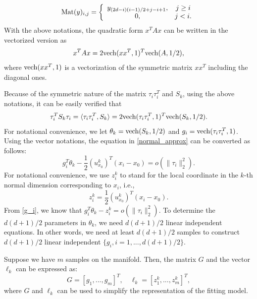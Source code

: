 \documentclass{article}
\theoremstyle{remark}
\begin{document}
\[
{\rm Mat} (y) _{i,j} =\left\{
\begin{array}{cc}
 y_{{(2d-i)(i-1)}/{2}+j-i+1},& j\geq i\\
 0,& j<i.
\end{array}
 \right.
\]
With the above notations, the quadratic form $x^T A x$ can be written in the vectorized version as
\[
x^T A x = 2{\rm vech}(xx^T,1)^T {\rm vech}(A,1/2),
\]
where ${\rm vech}(xx^T,1)$ is a vectorization of the symmetric matrix $xx^T$ including the diagonal ones.




Because of the symmetric nature of the matrix $\tau_i\tau_i^T$ and $S_k$, using the above notations, it can be easily verified that
\[
\tau_i^TS_k\tau_i = \langle \tau_i\tau_i^T, S_k\rangle =2{\rm vech}(\tau_i\tau_i^T,1)^T {\rm vech}(S_k,1/2).%
\]
For notational convenience, we let $\theta_k = {\rm vech}(S_k,1/2)$ and $g_i = {\rm vech}(\tau_i\tau_i^T,1)$.
Using the vector notations, the equation in \eqref{normal_approx} can be converted as follows:
\begin{equation}\label{g_i}
g_i^T \theta_k  - \frac{1}{2}{(u^k_{x_0})}^T (x_i -x_0) = o(\|\tau_i\|_2^2).
\end{equation}
For notational convenience, we use $z_i^k$ to stand for the local coordinate in the $k$-th normal dimension corresponding to $x_i$, i.e.,
\[
z_i^k =  \frac{1}{2}{(u^k_{x_0})}^T (x_i -x_0). %
\] 
From \eqref{g_i}, we know that
$
g_i^T \theta_k  - z_i^k= o(\|\tau_i\|_2^2).
$
To determine the ${d(d+1)}/{2}$ parameters in $\theta_k$, we need ${d(d+1)}/{2}$ linear independent equations. In other words, we need at least ${d(d+1)}/{2}$ samples to construct ${d(d+1)}/{2}$ linear independent $\{g_i, i = 1,...,{d(d+1)}/{2}\}$. 

Suppose we have $m$ samples on the manifold. Then, the matrix $G$ and the vector $\ell_k$ can be expressed as:
\[
G = [g_1,...,g_m]^T, \quad \ell_k = [z_1^k,..., z^k_m ]^T,
\]
where $G$ and $\ell_k$ can be used to simplify the representation of the fitting model.
\end{document}
